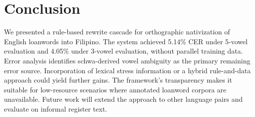 \section{Conclusion}

We presented a rule-based rewrite cascade for orthographic nativization of
English loanwords into Filipino. The system achieved 5.14\% CER under 5-vowel
evaluation and 4.05\% under 3-vowel evaluation, without parallel
training data. Error analysis identifies schwa-derived vowel ambiguity as the
primary remaining error source. Incorporation of lexical stress information or
a hybrid rule-and-data approach could yield further gains. The framework's
transparency makes it suitable for low-resource scenarios where annotated
loanword corpora are unavailable. Future work will extend the approach to other
language pairs and evaluate on informal register text.